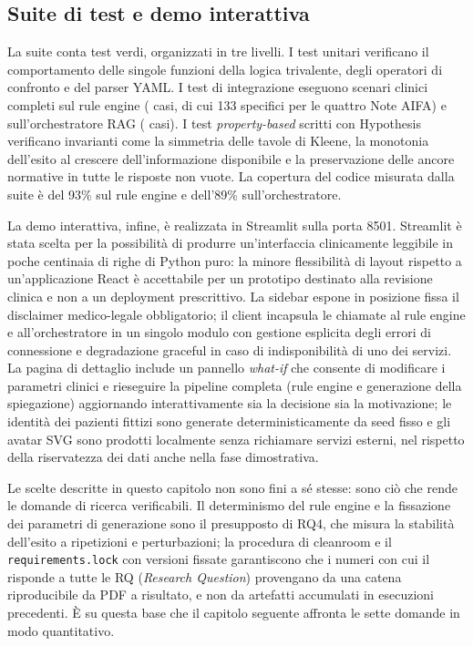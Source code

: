 \subsection{Suite di test e demo interattiva}
\label{subsec:test-demo-impl}

La suite conta \testcountall{} test verdi, organizzati in tre livelli. I test
unitari verificano il comportamento delle singole funzioni della logica
trivalente, degli operatori di confronto e del parser YAML. I test di
integrazione eseguono scenari clinici completi sul rule engine
(\testcountengine{} casi, di cui 133 specifici per le quattro Note AIFA) e
sull'orchestratore RAG (\testcountorch{} casi). I test \emph{property-based}
scritti con Hypothesis verificano invarianti come la
simmetria delle tavole di Kleene, la monotonia dell'esito al crescere
dell'informazione disponibile e la preservazione delle ancore normative in
tutte le risposte non vuote. La copertura del codice misurata dalla suite è
del 93\% sul rule engine e dell'89\% sull'orchestratore.

La demo interattiva, infine, è realizzata in Streamlit sulla porta 8501.
Streamlit è stata scelta per la possibilità di produrre un'interfaccia
clinicamente leggibile in poche centinaia di righe di Python puro: la minore
flessibilità di layout rispetto a un'applicazione React è accettabile per un
prototipo destinato alla revisione clinica e non a un deployment prescrittivo.
La sidebar espone in posizione fissa il disclaimer medico-legale obbligatorio;
il client incapsula le chiamate al rule engine e all'orchestratore in un
singolo modulo con gestione esplicita degli errori di connessione e
degradazione graceful in caso di indisponibilità di uno dei servizi. La
pagina di dettaglio include un pannello \emph{what-if} che consente di
modificare i parametri clinici e rieseguire la pipeline completa (rule engine
e generazione della spiegazione) aggiornando interattivamente sia la decisione
sia la motivazione; le identità dei pazienti fittizi sono generate
deterministicamente da seed fisso e gli avatar SVG sono prodotti localmente
senza richiamare servizi esterni, nel rispetto della riservatezza dei dati
anche nella fase dimostrativa.

Le scelte descritte in questo capitolo non sono fini a sé stesse: sono ciò che
rende le domande di ricerca verificabili. Il determinismo del rule engine e la
fissazione dei parametri di generazione sono il presupposto di RQ4, che misura
la stabilità dell'esito a ripetizioni e perturbazioni; la procedura di cleanroom
e il \texttt{requirements.lock} con versioni fissate garantiscono che i numeri con cui il
 risponde a tutte le RQ (\emph{Research Question}) provengano da una catena
riproducibile da PDF a risultato, e non da artefatti accumulati in esecuzioni
precedenti. È su questa base che il capitolo seguente affronta le sette domande
in modo quantitativo.
